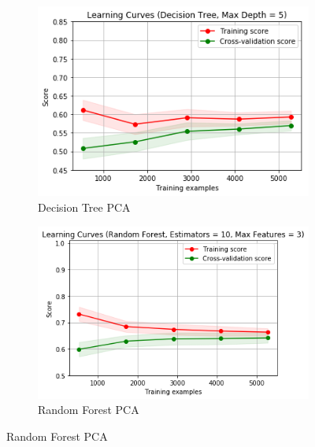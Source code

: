 \begin{figure}[ht!]
\begin{subfigure}{.5\textwidth}
  \centering
  \includegraphics[width=.8\linewidth]{figures/decision-tree-PCA.png}
  \caption{Decision Tree PCA}
  \label{fig:sub1}
\end{subfigure}%
\begin{subfigure}{.5\textwidth}
  \centering
  \includegraphics[width=.8\linewidth]{figures/random-forest-PCA.png}
  \caption{Random Forest PCA}
  \label{fig:sub2}
\end{subfigure}


\end{figure}
